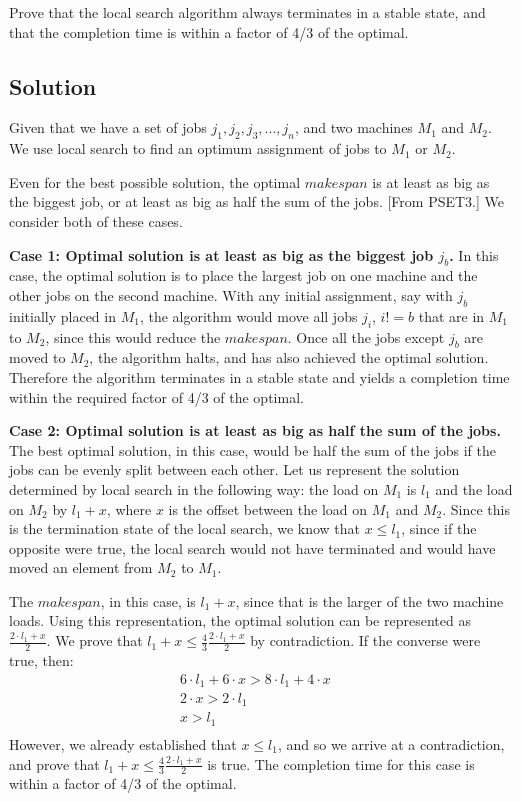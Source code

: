 \documentclass[11pt]{article}
\begin{document}
Prove that the local search algorithm always terminates in a stable state, and that the completion time is within a factor of 4/3 of the optimal.

\subsection{Solution}
Given that we have a set of jobs $j_1, j_2, j_3,..., j_n$, and two machines $M_1$ and $M_2$. We use local search to find an optimum assignment of jobs to $M_1$ or $M_2$. 
	
Even for the best possible solution, the optimal $makespan$ is at least as big as the biggest job, or at least as big as half the sum of the jobs. [From PSET3.] We consider both of these cases.
	
\textbf{Case 1: Optimal solution is at least as big as the biggest job $j_b$.}
In this case, the optimal solution is to place the largest job on one machine and the other jobs on the second machine. With any initial assignment, say with $j_b$ initially placed in $M_1$, the algorithm would move all jobs $j_i$, $i!=b$ that are in $M_1$ to $M_2$, since this would reduce the $makespan$. Once all the jobs except $j_b$ are moved to $M_2$, the algorithm halts, and has also achieved the optimal solution. Therefore the algorithm terminates in a stable state and yields a completion time within the required factor of 4/3 of the optimal.

\textbf{Case 2: Optimal solution is at least as big as half the sum of the jobs.}
The best optimal solution, in this case, would be half the sum of the jobs if the jobs can be evenly split between each other. Let us represent the solution determined by local search in the following way: the load on $M_1$ is $l_1$ and the load on $M_2$ by $l_1 + x$, where $x$ is the offset between the load on $M_1$ and $M_2$. Since this is the termination state of the local search, we know that $x \leq l_1$, since if the opposite were true, the local search would not have terminated and would have moved an element from $M_2$ to $M_1$.

The $makespan$, in this case, is $l_1 + x$, since that is the larger of the two machine loads. Using this representation, the optimal solution can be represented as $\frac{2 \cdot l_1 + x}{2}$. We prove that $l_1 + x \leq \frac{4}{3}\frac{2 \cdot l_1 + x}{2}$ by contradiction. If the converse were true, then:
\begin{align*}
	6 \cdot l_1 + 6 \cdot x > 8 \cdot l_1 + 4 \cdot x &\\
	2\cdot x > 2 \cdot l_1 & \\
	x > l_1 & \\
\end{align*}
However, we already established that $x \leq l_1$, and so we arrive at a contradiction, and prove that $l_1 + x \leq \frac{4}{3}\frac{2 \cdot l_1 + x}{2}$ is true. The completion time for this case is within a factor of 4/3 of the optimal.
\end{document}
